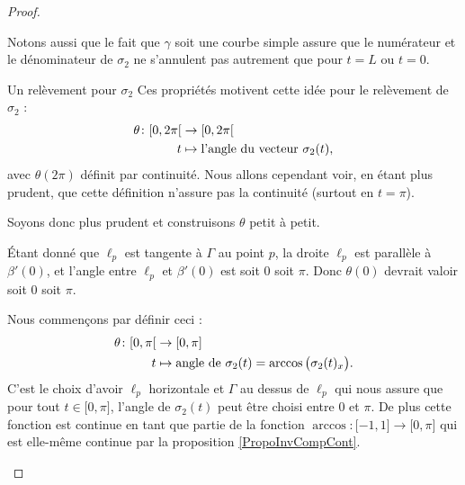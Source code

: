 \begin{proof}
\begin{subproof}
            Notons aussi que le fait que \( \gamma\) soit une courbe simple assure que le numérateur et le dénominateur de \( \sigma_2\) ne s'annulent pas autrement que pour \( t=L\) ou \( t=0\).
            
        \item[Un relèvement pour \( \sigma_2\)]
            Ces propriétés motivent cette idée pour le relèvement de \( \sigma_2\) :
            \begin{equation}
                \begin{aligned}
                    \theta\colon \mathopen[ 0 , 2\pi \mathclose[&\to\mathopen[ 0 , 2\pi \mathclose[  \\
                        t&\mapsto \text{l'angle du vecteur \( \sigma_2(t)\)},
                \end{aligned}
            \end{equation}
            avec \( \theta(2\pi)\) définit par continuité. Nous allons cependant voir, en étant plus prudent, que cette définition n'assure pas la continuité (surtout en \( t=\pi\)).

            Soyons donc plus prudent et construisons \( \theta\) petit à petit.

            Étant donné que \( \ell_p\) est tangente à \( \Gamma\) au point \(p \), la droite \( \ell_p\) est parallèle à \( \beta'(0)\), et l'angle entre \( \ell_p\) et \( \beta'(0)\) est soit \( 0\) soit \( \pi\). Donc \( \theta(0)\) devrait valoir soit \(0\) soit \(\pi\).

            Nous commençons par définir ceci :
            \begin{equation}
                \begin{aligned}
                    \theta\colon \mathopen[ 0 , \pi \mathclose[&\to \mathopen[ 0 , \pi \mathclose] \\
                    t&\mapsto \text{angle de \( \sigma_2(t)\)}=\arccos\big(  \sigma_2(t)_x   \big). 
                \end{aligned}
            \end{equation}
            C'est le choix d'avoir \( \ell_p\) horizontale et \( \Gamma\) au dessus de \( \ell_p\) qui nous assure que pour tout \( t\in\mathopen[ 0 , \pi \mathclose]\), l'angle de \( \sigma_2(t)\) peut être choisi entre \( 0\) et \( \pi\). De plus cette fonction est continue en tant que partie de la fonction \( \arccos\colon \mathopen[ -1 , 1 \mathclose]\to \mathopen[ 0 , \pi \mathclose]\) qui est elle-même continue par la proposition \ref{PropoInvCompCont}.


\end{subproof}
\end{proof}

